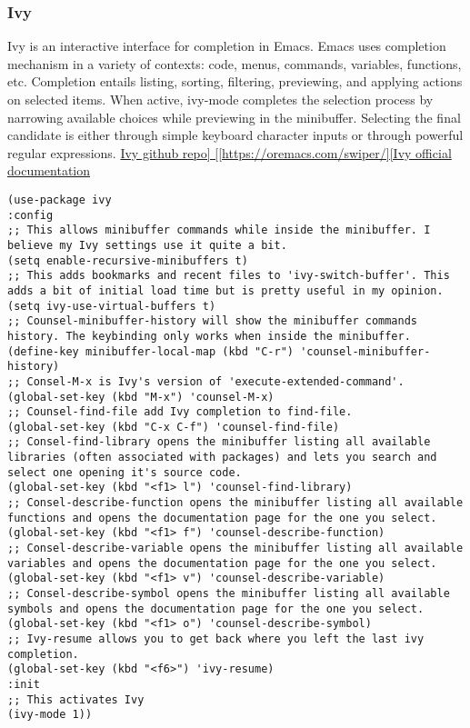 \documentclass[11pt]{article}
\begin{document}
\subsubsection{Ivy}
\label{sec:org0460c3d}
Ivy is an interactive interface for completion in Emacs. Emacs uses completion mechanism in a variety of contexts: code, menus, commands, variables, functions, etc. Completion entails listing, sorting, filtering, previewing, and applying actions on selected items. When active, ivy-mode completes the selection process by narrowing available choices while previewing in the minibuffer. Selecting the final candidate is either through simple keyboard character inputs or through powerful regular expressions.
\href{https://github.com/Microsoft/ivy}{Ivy github repo]
[[https://oremacs.com/swiper/][Ivy official documentation}
\begin{verbatim}
(use-package ivy
:config
;; This allows minibuffer commands while inside the minibuffer. I believe my Ivy settings use it quite a bit.
(setq enable-recursive-minibuffers t)
;; This adds bookmarks and recent files to 'ivy-switch-buffer'. This adds a bit of initial load time but is pretty useful in my opinion.
(setq ivy-use-virtual-buffers t)
;; Counsel-minibuffer-history will show the minibuffer commands history. The keybinding only works when inside the minibuffer.
(define-key minibuffer-local-map (kbd "C-r") 'counsel-minibuffer-history)
;; Consel-M-x is Ivy's version of 'execute-extended-command'. 
(global-set-key (kbd "M-x") 'counsel-M-x)
;; Counsel-find-file add Ivy completion to find-file.
(global-set-key (kbd "C-x C-f") 'counsel-find-file)
;; Consel-find-library opens the minibuffer listing all available libraries (often associated with packages) and lets you search and select one opening it's source code.
(global-set-key (kbd "<f1> l") 'counsel-find-library)
;; Consel-describe-function opens the minibuffer listing all available functions and opens the documentation page for the one you select.
(global-set-key (kbd "<f1> f") 'counsel-describe-function)
;; Consel-describe-variable opens the minibuffer listing all available variables and opens the documentation page for the one you select.
(global-set-key (kbd "<f1> v") 'counsel-describe-variable)
;; Consel-describe-symbol opens the minibuffer listing all available symbols and opens the documentation page for the one you select.
(global-set-key (kbd "<f1> o") 'counsel-describe-symbol)
;; Ivy-resume allows you to get back where you left the last ivy completion.
(global-set-key (kbd "<f6>") 'ivy-resume)
:init
;; This activates Ivy
(ivy-mode 1))
\end{verbatim}
\end{document}
